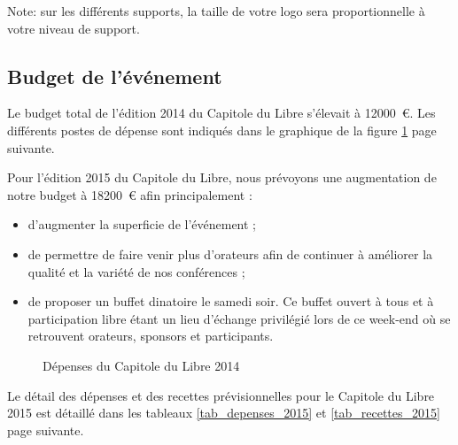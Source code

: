 Note: sur les différents supports, la taille de votre logo sera proportionnelle à votre niveau de support.

	\subsection{Budget de l’événement}

Le budget total de l'édition 2014 du Capitole du Libre s'élevait à \SI{12000}{\euro}. Les différents postes de dépense sont indiqués dans le graphique de la figure \ref{fig_budget} page suivante.

Pour l'édition 2015 du Capitole du Libre, nous prévoyons une augmentation de notre budget à \SI{18200}{€} afin principalement :
\begin{itemize}[label=$\bullet$]
\item d'augmenter la superficie de l'événement ;
\item de permettre de faire venir plus d'orateurs afin de continuer à améliorer la qualité et la variété de nos conférences ;
\item de proposer un buffet dinatoire le samedi soir. Ce buffet ouvert à tous et à participation libre étant un lieu d'échange privilégié lors de ce week-end où se retrouvent orateurs, sponsors et participants.
\end{itemize}

\begin{figure}
\begin{center}
\end{center}
\caption{Dépenses du Capitole du Libre 2014}\label{fig_budget}
\end{figure}

\Separateur

Le détail des dépenses et des recettes prévisionnelles pour le Capitole du Libre 2015 est détaillé dans les tableaux \ref{tab_depenses_2015} et \ref{tab_recettes_2015} page suivante.

